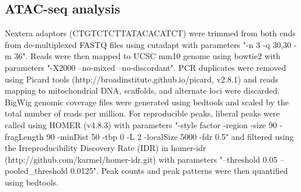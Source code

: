 \subsection{ATAC-seq analysis}
Nextera adaptors (CTGTCTCTTATACACATCT) were trimmed from both ends from de-multiplexed FASTQ files using cutadapt with parameters "-n 3 -q 30,30 -m 36". Reads were then mapped to UCSC mm10 genome using bowtie2 \citep{Langmead_2012} with parameters "-X2000 --no-mixed --no-discordant". PCR duplicates were removed using Picard tools (http://broadinstitute.github.io/picard, v2.8.1) and reads mapping to mitochondrial DNA, scaffolds, and alternate loci were discarded. BigWig genomic coverage files were generated using bedtools \citep{Quinlan_2010} and scaled by the total number of reads per million. For reproducible peaks, liberal peaks were called using HOMER (v4.8.3) \citep{Heinz_2010} with parameters "-style factor -region -size 90 -fragLength 90 -minDist 50 -tbp 0 -L 2 -localSize 5000 -fdr 0.5" and filtered using the Irreproducibility Discovery Rate (IDR) in homer-idr (http://github.com/karmel/homer-idr.git) with parameters "--threshold 0.05 --pooled_threshold 0.0125". Peak counts and peak patterns were then quantified using bedtools.

